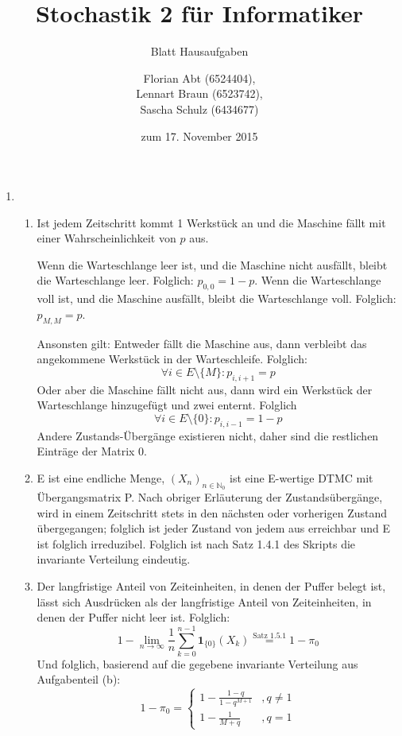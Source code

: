 \documentclass[a4paper]{scrartcl}
\title{Stochastik 2 für Informatiker}
\subtitle{Blatt {\blattnr} Hausaufgaben}
\author{
    Florian Abt (6524404), \\
    Lennart Braun (6523742), \\
    Sascha Schulz (6434677)
}
\date{zum 17. November 2015}
\newcommand{\N}{\mathbb{N}}
\def \blattnr {5}
\begin{document}
\maketitle

\begin{enumerate}[label=\bfseries \blattnr.\arabic*]
    \item
        \begin{enumerate}
            \item
	    
	    Ist jedem Zeitschritt kommt 1 Werkstück an und die Maschine fällt mit einer Wahrscheinlichkeit von $p$ aus.
	    
	    Wenn die Warteschlange leer ist, und die Maschine nicht ausfällt, bleibt die Warteschlange leer. Folglich: $p_{0,0}=1-p$.
	    Wenn die Warteschlange voll ist, und die Maschine ausfällt, bleibt die Warteschlange voll. Folglich: $p_{M,M}=p$.

	    Ansonsten gilt: Entweder fällt die Maschine aus, dann verbleibt das angekommene Werkstück in der Warteschleife. 
	    Folglich: $$\forall i \in E\setminus\{M\} \colon p_{i,i+1} = p$$ 
	    Oder aber die Maschine fällt nicht aus, dann wird ein Werkstück der Warteschlange 
	    hinzugefügt und zwei enternt. Folglich 
	    $$\forall i \in E\setminus\{0\} \colon p_{i,i-1} = 1 - p$$
	    Andere Zustands-Übergänge existieren nicht, daher sind die restlichen Einträge der Matrix 0.

            \item
            
            E ist eine endliche Menge, $(X_n)_{n\in\N_0}$ ist eine E-wertige
            DTMC mit Übergangsmatrix P. Nach obriger Erläuterung der Zustandsübergänge, wird in einem Zeitschritt stets in den nächsten 
            oder vorherigen Zustand übergegangen; folglich ist jeder Zustand von jedem aus erreichbar und E ist folglich irreduzibel. 
            Folglich ist nach Satz 1.4.1 des Skripts die invariante Verteilung eindeutig.

            \item
            
            Der langfristige Anteil von Zeiteinheiten, in denen der Puffer belegt ist, lässt sich Ausdrücken als der langfristige 
            Anteil von Zeiteinheiten, in denen der Puffer nicht leer ist. Folglich:
            \begin{equation*}
	      1 - \lim_{n\to\infty} \frac1n \sum_{k=0}^{n-1} \textbf{1}_{\{0\}}(X_k) \stackrel{\text{Satz } 1.5.1}{=} 1 - \pi_0
            \end{equation*}
            Und folglich, basierend auf die gegebene invariante Verteilung aus Aufgabenteil (b):
            \begin{equation*}
	      1 - \pi_0 = \begin{cases}
			    1 - \frac{1-q}{1-q^{M+1}} &,q \neq 1 \\
			    1 - \frac1{M+q} &, q = 1
	                  \end{cases}
            \end{equation*}
            



\end{enumerate}
\end{enumerate}
\end{document}
